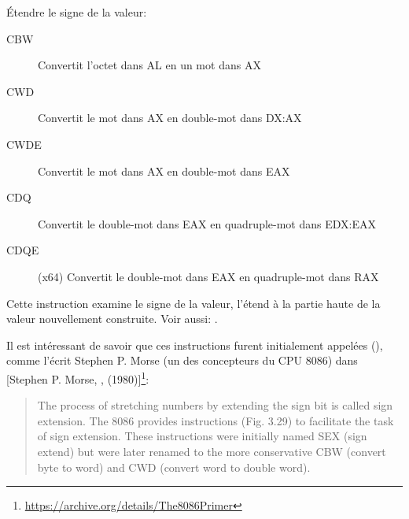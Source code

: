 \label{ins:CBW_CWD_etc}
\item[CBW/CWD/CWDE/CDQ/CDQE]

Étendre le signe de la valeur:

\begin{description}
\item[CBW] Convertit l'octet dans AL en un mot dans AX
\item[CWD] Convertit le mot dans AX en double-mot dans DX:AX
\item[CWDE] Convertit le mot dans AX en double-mot dans EAX
\item[CDQ] Convertit le double-mot dans EAX en quadruple-mot dans EDX:EAX
\item[CDQE] (x64) Convertit le double-mot dans EAX en quadruple-mot dans RAX
\end{description}

Cette instruction examine le signe de la valeur, l'étend à la partie haute de la
valeur nouvellement construite. Voir aussi: .

\newcommand{\StephenMorse}{[Stephen P. Morse, \IT{The 8086 Primer}, (1980)]\footnote{\AlsoAvailableAs \url{https://archive.org/details/The8086Primer}}}

Il est intéressant de savoir que ces instructions furent initialement appelées 
(), comme l'écrit Stephen P. Morse (un des concepteurs du CPU 8086)
dans \StephenMorse:

\begin{framed}
\begin{quotation}
The process of stretching numbers by extending the sign bit is called sign extension.
The 8086 provides instructions (Fig. 3.29) to facilitate the task of sign extension.
These instructions were initially named SEX (sign extend) but were later renamed to the more
conservative CBW (convert byte to word) and CWD (convert word to double word).
\end{quotation}
\end{framed}
